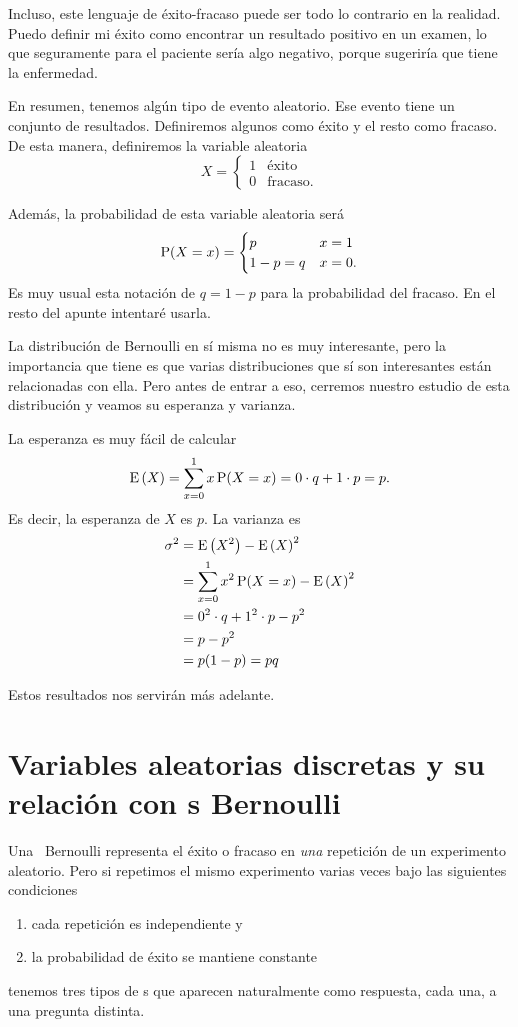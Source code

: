 Incluso, este lenguaje de éxito-fracaso puede ser todo lo contrario en la realidad. Puedo definir mi éxito como encontrar un resultado positivo en un examen, lo que seguramente para el paciente sería algo negativo, porque sugeriría que tiene la enfermedad.

En resumen, tenemos algún tipo de evento aleatorio. Ese evento tiene un conjunto de resultados. Definiremos algunos como éxito y el resto como fracaso. De esta manera, definiremos la variable aleatoria
\[X=\begin{cases}
    1 & \text{éxito}\\
    0 & \text{fracaso.}
\end{cases}\]

Además, la probabilidad de esta variable aleatoria será
\[\operatorname{P}(X=x)=\begin{cases}
    p&x=1\\
    1-p=q&x=0.
\end{cases}\]
Es muy usual esta notación de \(q=1-p\) para la probabilidad del fracaso. En el resto del apunte intentaré usarla. 

La distribución de Bernoulli en sí misma no es muy interesante, pero la importancia que tiene es que varias distribuciones que sí son interesantes están relacionadas con ella. Pero antes de entrar a eso, cerremos nuestro estudio de esta distribución y veamos su esperanza y  varianza.

La esperanza es muy fácil de calcular
\[\operatorname{E}\left(X\right) = \sum_{x=0}^{1}x\operatorname{P}(X=x)=0\cdot q+ 1\cdot p = p.\] Es decir, la esperanza de \(X\) es \(p\). La varianza es
\begin{align*}
    \sigma^2 &= \operatorname{E}\left(X^2\right)-\operatorname{E}\left(X\right)^2\\
    &= \sum_{x=0}^{1}x^2\operatorname{P}(X=x) - \operatorname{E}\left(X\right)^2\\
    &= 0^2\cdot q + 1^2\cdot p - p^2\\
    &= p-p^2\\
    &= p(1-p) = pq
\end{align*}

Estos resultados nos servirán más adelante.

\section{Variables aleatorias discretas y su relación con \va s Bernoulli}

Una \va\ Bernoulli representa el éxito o fracaso en \emph{una} repetición de un experimento aleatorio. Pero si repetimos el mismo experimento varias veces bajo las siguientes condiciones
\begin{enumerate}
\item cada repetición es independiente y
\item la probabilidad de éxito se mantiene constante
\end{enumerate}
tenemos tres tipos de \va s que aparecen naturalmente como respuesta, cada una, a una pregunta distinta.

